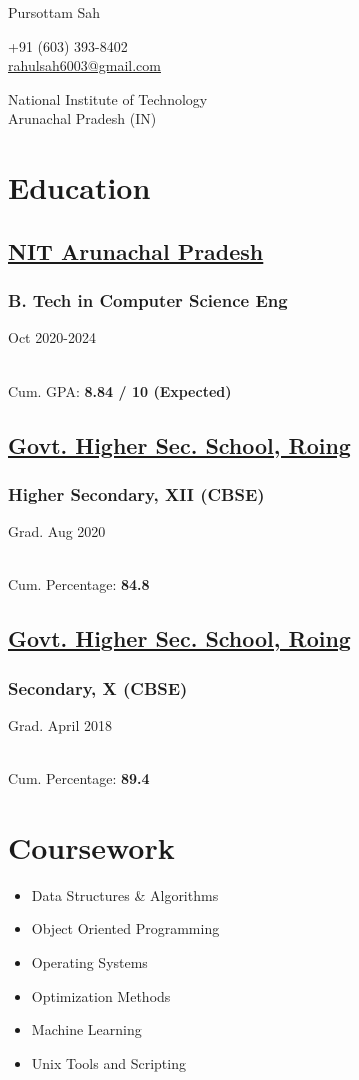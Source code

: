 \documentclass[]{article}
\newenvironment{tightemize}{
\vspace{-\topsep}\begin{itemize}\itemsep1pt \parskip1pt \parsep0pt}
{\end{itemize}\vspace{-\topsep}}
\newcommand{\namesection}[3]{
  \begin{multicols}{2}
    \begin{flushleft}
      \fontsize{30pt}{25pt}
      \fontspec[Path = fonts/ZillaSlab/]{ZillaSlab-Light}
      {{ #1 } {#2 }}
      \columnbreak\\
    \end{flushleft}
    \begin{flushright}
      { #3 }
    \end{flushright}
  \end{multicols}
  \vspace{-10pt}
}
\newcommand{\subheading}[2]{
  {\subsubsection*{#1}
  \hfill #2} 
}
\begin{document}
\namesection{Pursottam}{Sah}{
  +91 (603) 393-8402\\
  \href{mailto:rahulsah6003@gmail.com}{rahulsah6003@gmail.com}\par
  National Institute of Technology\\
  Arunachal Pradesh (IN)
}


\begin{multicols}{2}
  \begin{flushleft}
    \section*{Education}
    \subsection*{\href{http://nitap.ac.in/}{NIT Arunachal Pradesh}}
    \subheading{B. Tech in Computer Science Eng}{Oct 2020-2024} \\
    {Cum. GPA: \textbf{8.84 / 10 (Expected)}} 

    \subsection*{\href{https://roing.nic.in/public-utility/govt-hr-secondary-school-roing/}{Govt. Higher Sec. School, Roing}}
    \subheading{Higher Secondary, XII (CBSE)}{Grad. Aug 2020} \\
    {Cum. Percentage: \textbf{84.8}} 

    \subsection*{\href{https://roing.nic.in/public-utility/govt-hr-secondary-school-roing/}{Govt. Higher Sec. School, Roing}} 
    \subheading{Secondary, X (CBSE)}{Grad. April 2018} \\
    {Cum. Percentage: \textbf{89.4}} \\

    \section*{Coursework}
    \begin{tightemize}
      \item  {Data Structures \& Algorithms} 
      \item  {Object Oriented Programming}
      \item  {Operating Systems} 
      \item  {Optimization Methods} 
      \item  {Machine Learning}
      \item  {Unix Tools and Scripting} \\
    \end{tightemize}


\end{flushleft}
\end{multicols}
\end{document}
